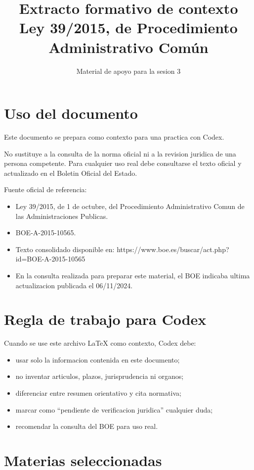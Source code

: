 \documentclass[a4paper,12pt]{article}
\title{Extracto formativo de contexto\\Ley 39/2015, de Procedimiento Administrativo Común}
\author{Material de apoyo para la sesion 3}
\date{}
\begin{document}
\maketitle

\section*{Uso del documento}

Este documento se prepara como contexto para una practica con Codex.

No sustituye a la consulta de la norma oficial ni a la revision juridica de una persona competente. Para cualquier uso real debe consultarse el texto oficial y actualizado en el Boletin Oficial del Estado.

Fuente oficial de referencia:

\begin{itemize}
    \item Ley 39/2015, de 1 de octubre, del Procedimiento Administrativo Comun de las Administraciones Publicas.
    \item BOE-A-2015-10565.
    \item Texto consolidado disponible en: https://www.boe.es/buscar/act.php?id=BOE-A-2015-10565
    \item En la consulta realizada para preparar este material, el BOE indicaba ultima actualizacion publicada el 06/11/2024.
\end{itemize}

\section*{Regla de trabajo para Codex}

Cuando se use este archivo LaTeX como contexto, Codex debe:

\begin{itemize}
    \item usar solo la informacion contenida en este documento;
    \item no inventar articulos, plazos, jurisprudencia ni organos;
    \item diferenciar entre resumen orientativo y cita normativa;
    \item marcar como ``pendiente de verificacion juridica'' cualquier duda;
    \item recomendar la consulta del BOE para uso real.
\end{itemize}

\section*{Materias seleccionadas}
\end{document}
